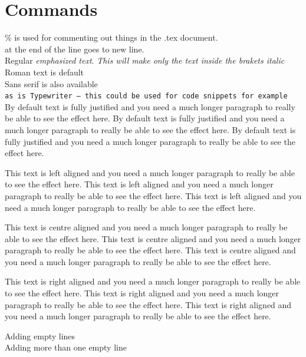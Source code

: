 \documentclass[16pt,a4paper]{article}
\begin{document}
\section{Commands}
\% is used for commenting out things in the .tex document.
\\ at the end of the line goes to new line. \\
Regular \emph{emphasized text}.
\textit{This will make only the \emph{text} inside the brakets italic}\\
\textrm{Roman text is default}\\
\textsf{Sans serif is also available}\\
\texttt{as is Typewriter – this could be used for code snippets for example}\\
By default text is fully justified and you need a much longer paragraph to really be able to see the effect here.
By default text is fully justified and you need a much longer paragraph to really be able to see the effect here.
By default text is fully justified and you need a much longer paragraph to really be able to see the effect here.
\begin{flushleft}
    This text is left aligned and you need a much longer paragraph to really be able to see the effect here.
    This text is left aligned and you need a much longer paragraph to really be able to see the effect here.
    This text is left aligned and you need a much longer paragraph to really be able to see the effect here.
\end{flushleft}
\begin{center}
    This text is centre aligned and you need a much longer paragraph to really be able to see the effect here.
    This text is centre aligned and you need a much longer paragraph to really be able to see the effect here.
    This text is centre aligned and you need a much longer paragraph to really be able to see the effect here.
\end{center}
\begin{flushright}
    This text is right aligned and you need a much longer paragraph to really be able to see the effect here.
    This text is right aligned and you need a much longer paragraph to really be able to see the effect here.
    This text is right aligned and you need a much longer paragraph to really be able to see the effect here.
\end{flushright}

Adding empty lines\\[\baselineskip]
Adding more than one empty line\\[2\baselineskip]
\end{document}
